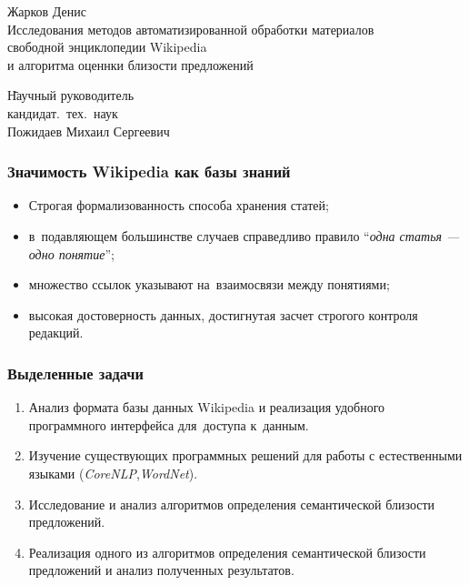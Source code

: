 \documentclass{beamer}
\begin{document}
\sloppy

\begin{frame}
\begin{center}
Жарков Денис\\
\vspace{1cm}
{\Large Исследования методов автоматизированной обработки материалов \\ 
свободной энциклопедии Wikipedia\\
и алгоритма оценнки близости предложений}
\end{center}
\begin{tabbing}
\hspace{6.5cm} \= Научный руководитель\\
\> кандидат.~тех.~наук\\
\> Пожидаев Михаил Сергеевич\\
\end{tabbing}
\end{frame}

\begin{frame}
\frametitle{Значимость Wikipedia как базы знаний}

\begin{itemize}
\item{
Строгая формализованность способа хранения статей;
}
\item{
в~подавляющем большинстве случаев справедливо
правило ``\textit{одна статья --- одно понятие}'';
}
\item{
множество ссылок указывают на~взаимосвязи между понятиями;
}
\item{
высокая достоверность данных, достигнутая засчет строгого контроля редакций.
}
\end{itemize}
\end{frame}

\begin{frame}
\frametitle{Выделенные задачи}
\begin{enumerate}
\item {
Анализ формата базы данных Wikipedia и реализация удобного программного интерфейса 
для~доступа к~данным.
}
\item {
Изучение существующих программных решений для работы с естественными языками (\textit{CoreNLP},\textit{WordNet}).
}
\item {
Исследование и анализ алгоритмов определения семантической близости предложений.
}
\item{
Реализация одного из алгоритмов определения семантической близости предложений и
анализ полученных результатов.
}
\end{enumerate}
\end{frame}
\end{document}
